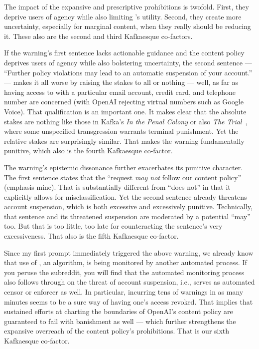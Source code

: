 The impact of the expansive and prescriptive prohibitions is twofold. First,
they deprive users of agency while also limiting \DALLE's utility. Second, they
create more uncertainty, especially for marginal content, when they really
should be reducing it. These also are the second and third Kafkaesque
co-factors.

If the warning's first sentence lacks actionable guidance and the content policy
deprives users of agency while also bolstering uncertainty, the second sentence
--- ``Further policy violations may lead to an automatic suspension of your
account.'' --- makes it all worse by raising the stakes to all or nothing ---
well, as far as having access to \DALLE{} with a particular email account,
credit card, and telephone number are concerned (with OpenAI rejecting virtual
numbers such as Google Voice). That qualification is an important one. It makes
clear that the absolute stakes are nothing like those in Kafka's \emph{In the
Penal Colony} or also \emph{The Trial}~\cite{Kafka2005}, where some unspecified
transgression warrants terminal punishment. Yet the relative stakes are
surprisingly similar. That makes the warning fundamentally punitive, which also
is the fourth Kafkaesque co-factor.

The warning's epistemic dissonance further exacerbates its punitive character.
The first sentence states that the ``request \emph{may not} follow our content
policy'' (emphasis mine). That is substantially different from ``does not'' in
that it explicitly allows for misclassification. Yet the second sentence already
threatens account suspension, which is both excessive and excessively punitive.
Technically, that sentence and its threatened suspension are moderated by a
potential ``may'' too. But that is too little, too late for counteracting the
sentence's very excessiveness. That also is the fifth Kafkaesque co-factor.

Since my first prompt immediately triggered the above warning, we already know
that use of \DALLE, an algorithm, is being monitored by another automated
process. If you peruse the \DALLE{} subreddit, you will find that the automated
monitoring process also follows through on the threat of account suspension,
i.e., serves as automated censor or enforcer as well. In particular, incurring
tens of warnings in as many minutes seems to be a sure way of having one's
access revoked. That implies that sustained efforts at charting the boundaries
of OpenAI's content policy are guaranteed to fail with banishment as well —
which further strengthens the expansive overreach of the content policy's
prohibitions. That is our sixth Kafkaesque co-factor.

